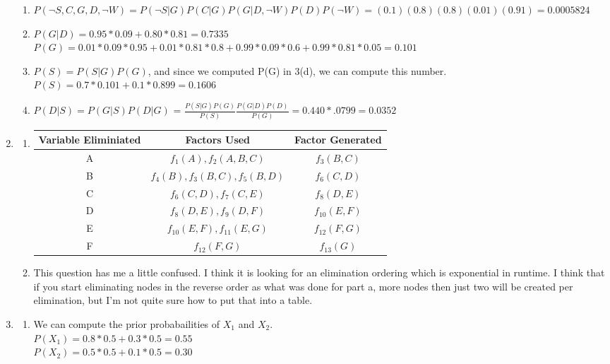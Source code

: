 \documentclass[11pt,fleqn]{article}
\begin{document}
\begin{enumerate}
\begin{enumerate}
\item %
$P(\lnot S, C, G, D, \lnot W) = P(\lnot S | G)P(C | G)P(G|D,\lnot W)P(D)P(\lnot W) = (0.1)(0.8)(0.8)(0.01)(0.91)=0.0005824$

\item %
$P(G|D) = 0.95*0.09+0.80*0.81 = 0.7335$ \\
$P(G) = 0.01*0.09*0.95+0.01*0.81*0.8+0.99*0.09*0.6+0.99*0.81*0.05 = 0.101$

\item %
$P(S) = P(S|G)P(G)$, and since we computed P(G) in 3(d), we can compute this number.\\
$P(S) = 0.7*0.101+0.1*0.899 = 0.1606$ 

\item %
$P(D | S) = P(G | S)P(D | G)$ = $\frac{P(S|G)P(G)}{P(S)} \frac{P(G|D)P(D)}{P(G)} = 0.440*.0799 = 0.0352$ 
\end{enumerate}

\item %
\begin{enumerate}
\item 
\begin{tabular}{|c|c|c|}
\hline
Variable Eliminiated & Factors Used & Factor Generated \\
\hline
A & $f_{1}(A), f_{2}(A,B,C)$ & $f_{3}(B,C)$ \\ 
B & $f_{4}(B), f_{3}(B,C), f_{5}(B,D)$ & $f_{6}(C,D)$ \\
C & $f_{6}(C,D), f_{7}(C,E)$ & $f_{8}(D,E)$ \\
D & $f_{8}(D,E), f_{9}(D,F)$ & $f_{10}(E,F)$ \\
E & $f_{10}(E,F), f_{11}(E,G)$ & $f_{12}(F,G)$ \\  
F & $f_{12}(F,G)$ & $f_{13}(G)$ \\
\hline
\end{tabular}
\item 
This question has me a little confused. I think it is looking for an elimination ordering which is exponential in runtime. I think that if you start eliminating nodes in the reverse order as what was done for part a, more nodes then just two will be created per elimination, but I'm not quite sure how to put that into a table. 
\end{enumerate}

\item %

\begin{enumerate}
\item %
We can compute the prior probabailities of $X_{1}$ and $X_{2}$.  \\
$P(X_{1}) = 0.8*0.5+0.3*0.5 = 0.55$ \\
$P(X_{2}) = 0.5*0.5+0.1*0.5 = 0.30$


\end{enumerate}
\end{enumerate}
\end{document}
